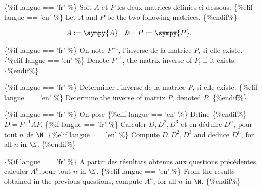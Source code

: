 \smallskip




\begin{comment}
$\N$
\end{comment}




\{\%if langue == 'fr' \%\}
Soit $A$ et $P$ les deux matrices définies ci-dessous.
\{\%elif langue == 'en' \%\}
Let $A$ and $P$ be the two following matrices.
\{\%endif\%\}




\begin{align}
&A:=  \sympy{A}&
& \& & 
&P:=  \sympy{P}.&
\end{align}








\{\%if langue == 'fr' \%\}
On note $P^{-1}$, l'inverse de la matrice $P$, si elle existe.
\{\%elif langue == 'en' \%\}
Denote  $P^{-1}$, the matrix inverse of $P$, if it exists.
\{\%endif\%\}

\ben

\item 
\{\%if langue == 'fr' \%\}
Determiner l'inverse de la matrice $P$, si elle existe.
\{\%elif langue == 'en' \%\}
Determine the inverse of matrix $P$, denoted $P$.
\{\%endif\%\}



\item
\{\%if langue == 'fr' \%\}
On pose 
\{\%elif langue == 'en' \%\}
Define
\{\%endif\%\}
$D=P^{-1}AP$. 
%
%
\{\%if langue == 'fr' \%\}
Calculer $D, D^{2}, D^{3}$ et en déduire $D^{n}$, pour tout $n$ de $\N$.
\{\%elif langue == 'en' \%\}
Compute $D, D^{2}, D^{3}$ and deduce $D^{n}$, for all $n$ in $\N$.
\{\%endif\%\}


\item
\{\%if langue == 'fr' \%\}
A partir des résultats obtenus aux questions précédentes, calculer $A^{n}$,pour tout  $n$ in $\N$.
\{\%elif langue == 'en' \%\}
From the results obtained in the previous questions, compute  $A^{n}$, for all $n$ in $\N$.
\{\%endif\%\}





\een








